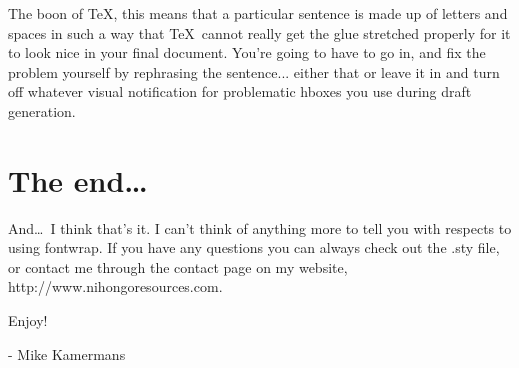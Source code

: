 \documentclass[12pt]{article}
\begin{document}
  The boon of \TeX , this means that a particular sentence is
  made up of letters and spaces in such a way that \TeX\ cannot
  really get the glue stretched properly for it to look nice
  in your final document. You're going to have to go in, and
  fix the problem yourself by rephrasing the sentence... either
  that or leave it in and turn off whatever visual notification
  for problematic hboxes you use during draft generation.
  
  \section{The end\ldots}
  
  And\ldots\ I think that's it. I can't think of anything more
  to tell you with respects to using fontwrap. If you have any
  questions you can always check out the .sty file, or contact
  me through the contact page on my website, http://www.nihongoresources.com.
  
  \bigskip
  
  Enjoy!

  \bigskip
  \bigskip
  
  - Mike Kamermans
\end{document}
